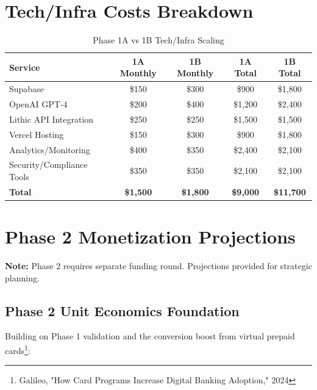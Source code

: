\documentclass[11pt,letterpaper]{article}
\begin{document}
\newpage

\section{Tech/Infra Costs Breakdown}

\begin{table}[h]
\centering
\caption{Phase 1A vs 1B Tech/Infra Scaling}
\begin{tabular}{|l|c|c|c|c|}
\hline
\textbf{Service} & \textbf{1A Monthly} & \textbf{1B Monthly} & \textbf{1A Total} & \textbf{1B Total} \\
\hline
Supabase & \$150 & \$300 & \$900 & \$1,800 \\
OpenAI GPT-4 & \$200 & \$400 & \$1,200 & \$2,400 \\
Lithic API Integration & \$250 & \$250 & \$1,500 & \$1,500 \\
Vercel Hosting & \$150 & \$300 & \$900 & \$1,800 \\
Analytics/Monitoring & \$400 & \$350 & \$2,400 & \$2,100 \\
Security/Compliance Tools & \$350 & \$350 & \$2,100 & \$2,100 \\
\textbf{Total} & \textbf{\$1,500}& \textbf{\$1,800}& \textbf{\$9,000}& \textbf{\$11,700}\\
\hline
\end{tabular}
\end{table}

\section{Phase 2 Monetization Projections}

\textbf{Note:} Phase 2 requires separate funding round. Projections provided for strategic planning.

\subsection{Phase 2 Unit Economics Foundation}

Building on Phase 1 validation and the conversion boost from virtual prepaid cards\footnote{Galileo, "How Card Programs Increase Digital Banking Adoption," 2024}:
\end{document}

